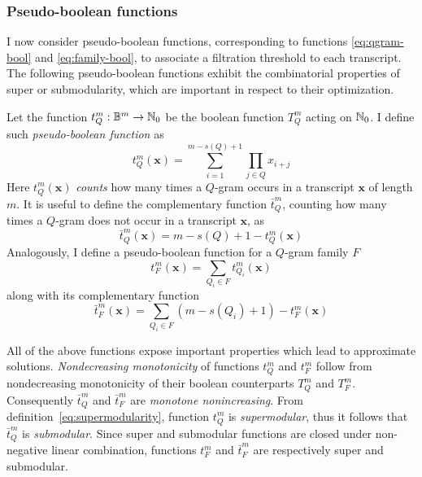 \subsubsection{Pseudo-boolean functions}

I now consider pseudo-boolean functions, corresponding to functions \ref{eq:qgram-bool} and \ref{eq:family-bool}, to associate a filtration threshold to each transcript.
The following pseudo-boolean functions exhibit the combinatorial properties of super or submodularity, which are important in respect to their optimization.

Let the function $t_{Q}^{m}: \mathbb {B}^m \rightarrow \mathbb {N}_0$ be the boolean function $T_{Q}^{m}$ acting on $\mathbb {N}_0$.
I define such \emph{pseudo-boolean function} as
\begin{equation}
\label{eq:qgram-pseudo}
t_{Q}^{m}(\mathbf{x}) = \sum_{i=1}^{m-s(Q)+1} \prod_{j \in Q} x_{i+j}
\end{equation}
Here $t_{Q}^{m}(\mathbf{x})$ \emph{counts} how many times a $Q$-gram occurs in a transcript $\mathbf{x}$ of length $m$.
It is useful to define the complementary function $\bar{t}_{Q}^{m}$, counting how many times a $Q$-gram does not occur in a transcript $\mathbf{x}$, as
\begin{equation}
\label{eq:qgram-pseudoneg}
\bar{t}_{Q}^{m}(\mathbf{x}) = m - s(Q) + 1 - t_{Q}^{m}(\mathbf{x})
\end{equation}
Analogously, I define a pseudo-boolean function for a $Q$-gram family $F$
\begin{equation}
\label{eq:family-pseudo}
t_{F}^{m}(\mathbf{x}) = \sum_{Q_i \in F} t_{Q_i}^{m}(\mathbf{x})
\end{equation}
along with its complementary function
\begin{equation}
\label{eq:family-pseudoneg}
\bar{t}_{F}^{m}(\mathbf{x}) = \sum_{Q_i \in F}{(m - s(Q_i) + 1)} - t_{F}^{m}(\mathbf{x})
\end{equation}

All of the above functions expose important properties which lead to approximate solutions.
\emph{Nondecreasing monotonicity} of functions $t_{Q}^{m}$ and $t_{F}^{m}$ follow from nondecreasing monotonicity of their boolean counterparts $T_{Q}^{m}$ and $T_{F}^{m}$. Consequently $\bar{t}_{Q}^{m}$ and $\bar{t}_{F}^{m}$ are \emph{monotone nonincreasing}.
From definition~\ref{eq:supermodularity}, function $t_{Q}^{m}$ is \emph{supermodular}, thus it follows that $\bar{t}_{Q}^{m}$ is \emph{submodular}.
Since super and submodular functions are closed under non-negative linear combination, functions $t_{F}^{m}$ and $\bar{t}_{F}^{m}$ are respectively super and submodular.

